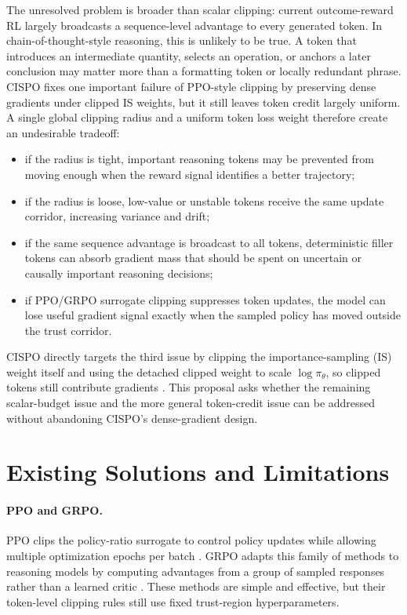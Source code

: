 \documentclass[11pt]{article}
\begin{document}
The unresolved problem is broader than scalar clipping: current outcome-reward
RL largely broadcasts a sequence-level advantage to every generated token. In
chain-of-thought-style reasoning, this is unlikely to be true. A token that
introduces an intermediate quantity, selects an operation, or anchors a later
conclusion may matter more than a formatting token or locally redundant phrase.
CISPO fixes one important failure of PPO-style clipping by preserving dense
gradients under clipped IS weights, but it still leaves token credit largely
uniform. A single global clipping radius and a uniform token loss weight
therefore create an undesirable tradeoff:
\begin{itemize}[leftmargin=*]
  \item if the radius is tight, important reasoning tokens may be prevented
  from moving enough when the reward signal identifies a better trajectory;
  \item if the radius is loose, low-value or unstable tokens receive the same
  update corridor, increasing variance and drift;
  \item if the same sequence advantage is broadcast to all tokens, deterministic
  filler tokens can absorb gradient mass that should be spent on uncertain or
  causally important reasoning decisions;
  \item if PPO/GRPO surrogate clipping suppresses token updates, the model can
  lose useful gradient signal exactly when the sampled policy has moved outside
  the trust corridor.
\end{itemize}

CISPO directly targets the third issue by clipping the importance-sampling
(IS) weight itself and using the detached clipped weight to scale
$\log \pi_\theta$, so clipped tokens still contribute gradients
\cite{minimax2025m1}. This proposal asks whether the remaining scalar-budget issue
and the more general token-credit issue can be addressed without abandoning
CISPO's dense-gradient design.

\section{Existing Solutions and Limitations}

\paragraph{PPO and GRPO.}
PPO clips the policy-ratio surrogate to control policy updates while allowing
multiple optimization epochs per batch \cite{schulman2017ppo}. GRPO adapts
this family of methods to reasoning models by computing advantages from a
group of sampled responses rather than a learned critic
\cite{shao2024deepseekmath}. These methods are simple and effective, but their
token-level clipping rules still use fixed trust-region hyperparameters.
\end{document}
